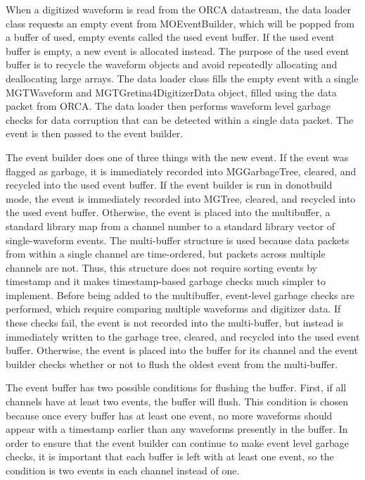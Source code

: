 \documentclass[/main.tex]{subfiles}
\begin{document}
When a digitized waveform is read from the ORCA datastream, the data loader class requests an empty event from MOEventBuilder, which will be popped from a buffer of used, empty events called the used event buffer.
If the used event buffer is empty, a new event is allocated instead.
The purpose of the used event buffer is to recycle the waveform objects and avoid repeatedly allocating and deallocating large arrays.
The data loader class fills the empty event with a single MGTWaveform and MGTGretina4DigitizerData object, filled using the data packet from ORCA.
The data loader then performs waveform level garbage checks for data corruption that can be detected within a single data packet.
The event is then passed to the event builder.
\par
The event builder does one of three things with the new event.
If the event was flagged as garbage, it is immediately recorded into MGGarbageTree, cleared, and recycled into the used event buffer.
If the event builder is run in donotbuild mode, the event is immediately recorded into MGTree, cleared, and recycled into the used event buffer.
Otherwise, the event is placed into the multibuffer, a \cpp standard library map from a channel number to a \cpp standard library vector of single-waveform events.
The multi-buffer structure is used because data packets from within a single channel are time-ordered, but packets across multiple channels are not.
Thus, this structure does not require sorting events by timestamp and it makes timestamp-based garbage checks much simpler to implement.
Before being added to the multibuffer, event-level garbage checks are performed, which require comparing multiple waveforms and digitizer data.
If these checks fail, the event is not recorded into the multi-buffer, but instead is immediately written to the garbage tree, cleared, and recycled into the used event buffer.
Otherwise, the event is placed into the buffer for its channel and the event builder checks whether or not to flush the oldest event from the multi-buffer.
\par
The event buffer has two possible conditions for flushing the buffer.
First, if all channels have at least two events, the buffer will flush.
This condition is chosen because once every buffer has at least one event, no more waveforms should appear with a timestamp earlier than any waveforms presently in the buffer.
In order to ensure that the event builder can continue to make event level garbage checks, it is important that each buffer is left with at least one event, so the condition is two events in each channel instead of one.
\end{document}
